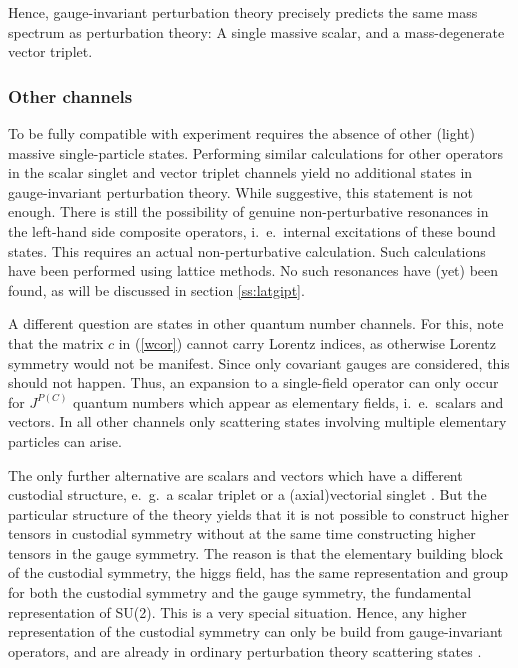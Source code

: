 \documentclass[final,12pt]{article}
\newcommand*{\pref}[1]{(\ref{#1})}
\newcommand*{\1}{1\!\!\!\bot}
\begin{document}
Hence, gauge-invariant perturbation theory precisely predicts the same mass spectrum as perturbation theory: A single massive scalar, and a mass-degenerate vector triplet.

\subsubsection{Other channels}

To be fully compatible with experiment requires the absence of other (light) massive single-particle states. Performing similar calculations for other operators in the scalar singlet and vector triplet channels yield no additional states in gauge-invariant perturbation theory. While suggestive, this statement is not enough. There is still the possibility of genuine non-perturbative resonances in the left-hand side composite operators, i.\ e.\ internal excitations of these bound states. This requires an actual non-perturbative calculation. Such calculations have been performed using lattice methods. No such resonances have (yet) been found, as will be discussed in section \ref{ss:latgipt}.

A different question are states in other quantum number channels. For this, note that the matrix $c$ in \pref{wcor} cannot carry Lorentz indices, as otherwise Lorentz symmetry would not be manifest. Since only covariant gauges are considered, this should not happen. Thus, an expansion to a single-field operator can only occur for $J^{P(C)}$ quantum numbers which appear as elementary fields, i.\ e.\ scalars and vectors. In all other channels only scattering states involving multiple elementary particles can arise.

The only further alternative are scalars and vectors which have a different custodial structure, e.\ g.\ a scalar triplet or a (axial)vectorial singlet \cite{Wurtz:2013ova}. But the particular structure of the theory yields that it is not possible to construct higher tensors in custodial symmetry without at the same time constructing higher tensors in the gauge symmetry. The reason is that the elementary building block of the custodial symmetry, the higgs field, has the same representation and group for both the custodial symmetry and the gauge symmetry, the fundamental representation of SU(2). This is a very special situation. Hence, any higher representation of the custodial symmetry can only be build from gauge-invariant operators, and are already in ordinary perturbation theory scattering states \cite{Wurtz:2013ova}.
\end{document}
